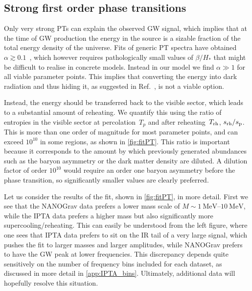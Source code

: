 \documentclass{article}
\begin{document}
\subsection{Strong first order phase transitions}
\label{sec:FOPT_result}

Only very strong PTs can explain the observed GW signal, which implies that at the time of GW production the energy in the source is a sizable fraction of the total energy density of the universe. Fits of generic PT spectra have obtained $\alpha \gtrsim 0.1$~\cite{Ratzinger:2020koh,Bai:2021ibt,NANOGrav:2021flc}, which however requires pathologically small values of $\beta/H_*$ that might be difficult to realise in concrete models. Instead in our model we find $\alpha \gg 1$ for all viable parameter points. This implies that converting the energy into dark radiation and thus hiding it, as suggested in Ref.~\cite{Breitbach:2018ddu}, is not a viable option. 

Instead, the energy should be transferred back to the visible sector, which leads to a substantial amount of reheating. We quantify this using the ratio of entropies in the visible sector at percolation~$T_p$ and after reheating~$T_{\rm rh}$, $s_{\rm rh}/s_{\rm p}$. This is more than one order of magnitude for most parameter points, and can exceed $10^{10}$ in some regions, as shown in \cref{fig:fitPT}. This ratio is important because it corresponds to the amount by which previously generated abundances such as the baryon asymmetry or the dark matter density are diluted. A dilution factor of order $10^{10}$ would require an order one baryon asymmetry before the phase transition, so significantly smaller values are clearly preferred. 

Let us consider the results of the fit, shown in \cref{fig:fitPT}, in more detail. First we see that the NANOGrav data prefers a lower mass scale of $M \sim \SIrange{1}{10}{\MeV}$, while the IPTA data prefers a higher mass but also significantly more supercooling/reheating. This can easily be understood from the left figure, where one sees that IPTA data prefers to sit on the IR tail of a very large signal, which pushes the fit to larger masses and larger amplitudes, while NANOGrav prefers to have the GW peak at lower frequencies. This discrepancy depends quite sensitively on the number of frequency bins included for each dataset, as discussed in more detail in \cref{app:IPTA_bins}. Ultimately, additional data will hopefully resolve this situation. 
\end{document}
